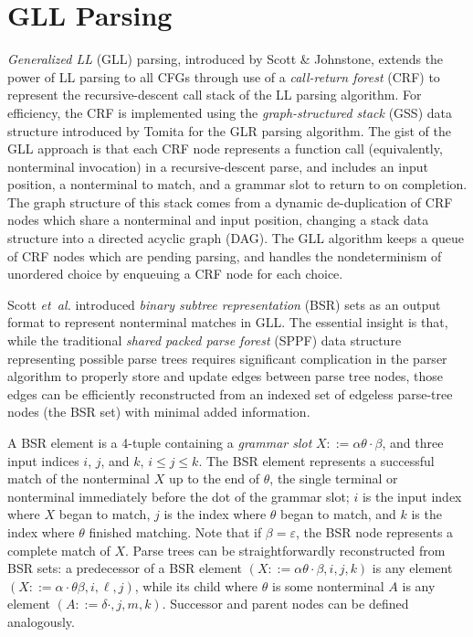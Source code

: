 \documentclass{article}
\makeatletter
\newcommand{\etal}{\textit{et~al.}\@}
\makeatother
\begin{document}
\section{GLL Parsing}
\emph{Generalized LL} (GLL) parsing, introduced by Scott \& Johnstone\cite{SJ10,SJvB19}, extends the power of LL parsing to all CFGs through use of a \emph{call-return forest} (CRF) to represent the recursive-descent call stack of the LL parsing algorithm. 
For efficiency, the CRF is implemented using the \emph{graph-structured stack} (GSS) data structure introduced by Tomita\cite{Tom85} for the GLR parsing algorithm. 
The gist of the GLL approach is that each CRF node represents a function call (equivalently, nonterminal invocation) in a recursive-descent parse, and includes an input position, a nonterminal to match, and a grammar slot to return to on completion. 
The graph structure of this stack comes from a dynamic de-duplication of CRF nodes which share a nonterminal and input position, changing a stack data structure into a directed acyclic graph (DAG). 
The GLL algorithm keeps a queue of CRF nodes which are pending parsing, and handles the nondeterminism of unordered choice by enqueuing a CRF node for each choice.

Scott \etal\cite{SJvB19} introduced \emph{binary subtree representation} (BSR) sets as an output format to represent nonterminal matches in GLL. 
The essential insight is that, while the traditional \emph{shared packed parse forest} (SPPF)\cite{Tom85} data structure representing possible parse trees requires significant complication in the parser algorithm to properly store and update edges between parse tree nodes, those edges can be efficiently reconstructed from an indexed set of edgeless parse-tree nodes (the BSR set) with minimal added information. 

A BSR element is a 4-tuple containing a \emph{grammar slot} $X ::= \alpha\theta\cdot\beta$, and three input indices $i$, $j$, and $k$, $i \leq j \leq k$. 
The BSR element represents a successful match of the nonterminal $X$ up to the end of $\theta$, the single terminal or nonterminal immediately before the dot of the grammar slot; $i$ is the input index where $X$ began to match, $j$ is the index where $\theta$ began to match, and $k$ is the index where $\theta$ finished matching. 
Note that if $\beta = \varepsilon$, the BSR node represents a complete match of $X$.
Parse trees can be straightforwardly reconstructed from BSR sets: a predecessor of a BSR element $(X ::= \alpha\theta\cdot\beta, i, j, k)$ is any element $(X ::= \alpha\cdot\theta\beta, i, \ell, j)$, while its child where $\theta$ is some nonterminal $A$ is any element $(A ::= \delta\cdot, j, m, k)$. Successor and parent nodes can be defined analogously.



\end{document}
